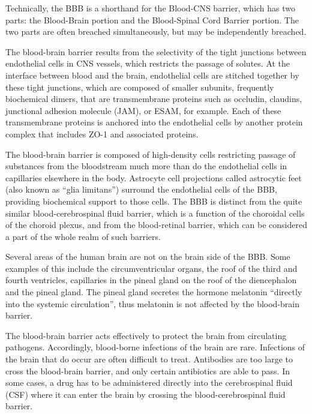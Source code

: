Technically, the BBB is a shorthand for the Blood-CNS barrier, which has two parts: the Blood-Brain portion and the Blood-Spinal Cord Barrier portion. The two parts are often breached simultaneously, but may be independently breached.

The blood-brain barrier results from the selectivity of the tight junctions between endothelial cells in CNS vessels, which restricts the passage of solutes. At the interface between blood and the brain, endothelial cells are stitched together by these tight junctions, which are composed of smaller subunits, frequently biochemical dimers, that are transmembrane proteins such as occludin, claudins, junctional adhesion molecule (JAM), or ESAM, for example. Each of these transmembrane proteins is anchored into the endothelial cells by another protein complex that includes ZO-1 and associated proteins.

The blood-brain barrier is composed of high-density cells restricting passage of substances from the bloodstream much more than do the endothelial cells in capillaries elsewhere in the body. Astrocyte cell projections called astrocytic feet (also known as ``glia limitans'') surround the endothelial cells of the BBB, providing biochemical support to those cells. The BBB is distinct from the quite similar blood-cerebrospinal fluid barrier, which is a function of the choroidal cells of the choroid plexus, and from the blood-retinal barrier, which can be considered a part of the whole realm of such barriers.

Several areas of the human brain are not on the brain side of the BBB. Some examples of this include the circumventricular organs, the roof of the third and fourth ventricles, capillaries in the pineal gland on the roof of the diencephalon and the pineal gland. The pineal gland secretes the hormone melatonin ``directly into the systemic circulation'', thus melatonin is not affected by the blood-brain barrier.

The blood-brain barrier acts effectively to protect the brain from circulating pathogens. Accordingly, blood-borne infections of the brain are rare. Infections of the brain that do occur are often difficult to treat. Antibodies are too large to cross the blood-brain barrier, and only certain antibiotics are able to pass. In some cases, a drug has to be administered directly into the cerebrospinal fluid (CSF) where it can enter the brain by crossing the blood-cerebrospinal fluid barrier.

